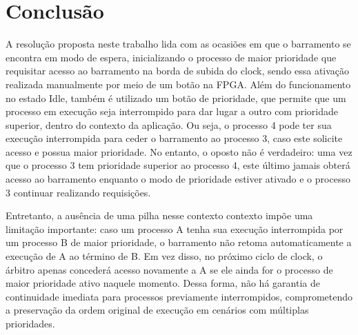 \documentclass[oneside]{uffstex}
\begin{document}
\chapter{Conclusão}
A resolução proposta neste trabalho lida com as ocasiões em que o barramento se encontra em modo de espera, inicializando o processo de maior prioridade que requisitar acesso ao barramento na borda de subida do clock, sendo essa ativação realizada manualmente por meio de um botão na FPGA. Além do funcionamento no estado Idle, também é utilizado um botão de prioridade, que permite que um processo em execução seja interrompido para dar lugar a outro com prioridade superior, dentro do contexto da aplicação. Ou seja, o processo 4 pode ter sua execução interrompida para ceder o barramento ao processo 3, caso este solicite acesso e possua maior prioridade. No entanto, o oposto não é verdadeiro: uma vez que o processo 3 tem prioridade superior ao processo 4, este último jamais obterá acesso ao barramento enquanto o modo de prioridade estiver ativado e o processo 3 continuar realizando requisições.

Entretanto, a ausência de uma pilha nesse contexto contexto impõe uma limitação importante: caso um processo A tenha sua execução interrompida por um processo B de maior prioridade, o barramento não retoma automaticamente a execução de A ao término de B. Em vez disso, no próximo ciclo de clock, o árbitro apenas concederá acesso novamente a A se ele ainda for o processo de maior prioridade ativo naquele momento. Dessa forma, não há garantia de continuidade imediata para processos previamente interrompidos, comprometendo a preservação da ordem original de execução em cenários com múltiplas prioridades.
\end{document}
